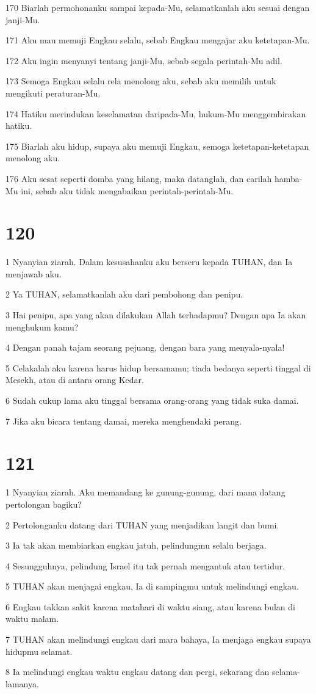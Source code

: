 \par 170 Biarlah permohonanku sampai kepada-Mu, selamatkanlah aku sesuai dengan janji-Mu.
\par 171 Aku mau memuji Engkau selalu, sebab Engkau mengajar aku ketetapan-Mu.
\par 172 Aku ingin menyanyi tentang janji-Mu, sebab segala perintah-Mu adil.
\par 173 Semoga Engkau selalu rela menolong aku, sebab aku memilih untuk mengikuti peraturan-Mu.
\par 174 Hatiku merindukan keselamatan daripada-Mu, hukum-Mu menggembirakan hatiku.
\par 175 Biarlah aku hidup, supaya aku memuji Engkau, semoga ketetapan-ketetapan menolong aku.
\par 176 Aku sesat seperti domba yang hilang, maka datanglah, dan carilah hamba-Mu ini, sebab aku tidak mengabaikan perintah-perintah-Mu.

\chapter{120}

\par 1 Nyanyian ziarah. Dalam kesusahanku aku berseru kepada TUHAN, dan Ia menjawab aku.
\par 2 Ya TUHAN, selamatkanlah aku dari pembohong dan penipu.
\par 3 Hai penipu, apa yang akan dilakukan Allah terhadapmu? Dengan apa Ia akan menghukum kamu?
\par 4 Dengan panah tajam seorang pejuang, dengan bara yang menyala-nyala!
\par 5 Celakalah aku karena harus hidup bersamamu; tiada bedanya seperti tinggal di Mesekh, atau di antara orang Kedar.
\par 6 Sudah cukup lama aku tinggal bersama orang-orang yang tidak suka damai.
\par 7 Jika aku bicara tentang damai, mereka menghendaki perang.

\chapter{121}

\par 1 Nyanyian ziarah. Aku memandang ke gunung-gunung, dari mana datang pertolongan bagiku?
\par 2 Pertolonganku datang dari TUHAN yang menjadikan langit dan bumi.
\par 3 Ia tak akan membiarkan engkau jatuh, pelindungmu selalu berjaga.
\par 4 Sesungguhnya, pelindung Israel itu tak pernah mengantuk atau tertidur.
\par 5 TUHAN akan menjagai engkau, Ia di sampingmu untuk melindungi engkau.
\par 6 Engkau takkan sakit karena matahari di waktu siang, atau karena bulan di waktu malam.
\par 7 TUHAN akan melindungi engkau dari mara bahaya, Ia menjaga engkau supaya hidupmu selamat.
\par 8 Ia melindungi engkau waktu engkau datang dan pergi, sekarang dan selama-lamanya.

